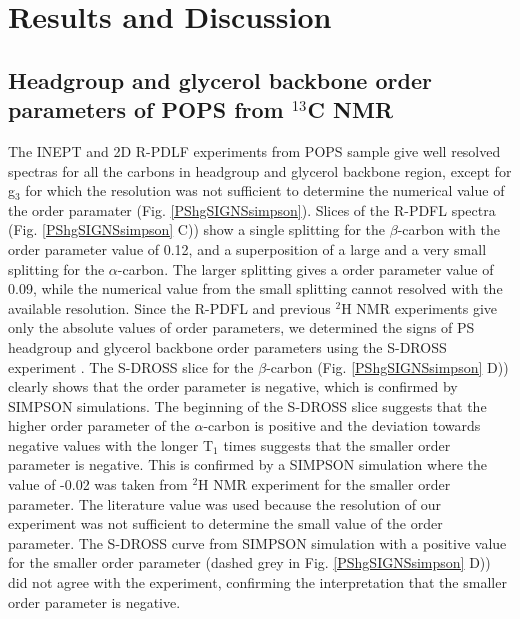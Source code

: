 \documentclass[aps,prl,superscriptaddress,twocolumn]{revtex4}
\begin{document}


\section{Results and Discussion}

\subsection{Headgroup and glycerol backbone order parameters of POPS from $^{13}$C NMR}

The INEPT and 2D R-PDLF experiments from POPS sample give well resolved spectras for all the
carbons in headgroup and glycerol backbone region, except for g$_3$ for which the resolution
was not sufficient to determine the numerical value of the order paramater (Fig. \ref{PShgSIGNSsimpson}).
Slices of the R-PDFL spectra (Fig. \ref{PShgSIGNSsimpson} C)) 
show a single splitting for the $\beta$-carbon with the order parameter value of 0.12,
and a superposition of a large and a very small splitting for the $\alpha$-carbon.
The larger splitting gives a order parameter value of 0.09, while the numerical value
from the small splitting cannot resolved with the available resolution.
Since the R-PDFL and previous $^2$H NMR experiments \cite{browning80,roux91} give 
only the absolute values of order parameters, we determined the signs of PS headgroup
and glycerol backbone order parameters using the S-DROSS experiment \cite{gross97}.
The S-DROSS slice for the $\beta$-carbon (Fig. \ref{PShgSIGNSsimpson} D)) clearly shows that the
order parameter is negative, which is confirmed by SIMPSON simulations.
The beginning of the S-DROSS slice suggests that the higher order parameter of
the $\alpha$-carbon is positive and the deviation towards negative values with the longer T$_1$ times suggests
that the smaller order parameter is negative. This is confirmed by a SIMPSON simulation
where the value of -0.02 was taken from $^2$H NMR experiment \cite{roux91} for the smaller order parameter.
The literature value was used because the
resolution of our experiment was not sufficient to determine the
small value of the order parameter. The S-DROSS curve from
SIMPSON simulation with a positive value for the smaller order parameter
(dashed grey in Fig. \ref{PShgSIGNSsimpson} D)) did not agree with the experiment, 
confirming the interpretation that the smaller order parameter is negative.
\end{document}
